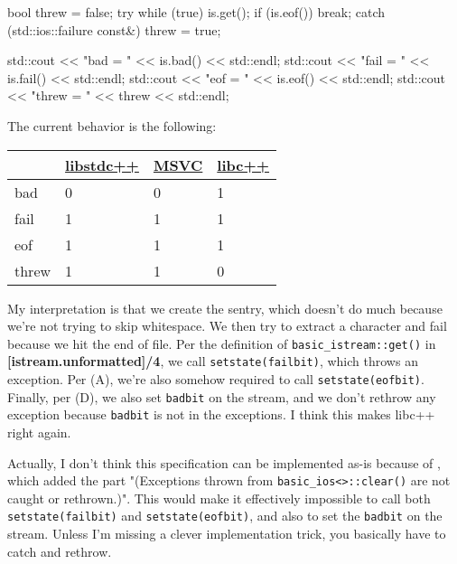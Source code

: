 \documentclass{wg21}
\newcommand{\cc}[1]{\texttt{#1}}
\begin{document}
\begin{enumerate}
\begin{cpp}
{      bool threw = false;
      try {
          while (true) {
              is.get();
              if (is.eof())
                  break;
          }
      } catch (std::ios::failure const&) {
          threw = true;
      }

      std::cout << "bad = " << is.bad() << std::endl;
      std::cout << "fail = " << is.fail() << std::endl;
      std::cout << "eof = " << is.eof() << std::endl;
      std::cout << "threw = " << threw << std::endl;
  }
  \end{cpp}

  The current behavior is the following:
  \begin{center}
  \begin{tabular}{| l | l | l | l |}
  \hline
         & \href{https://wandbox.org/permlink/jSSGM6TcqLzZSl6M}{libstdc++}
         & \href{http://rextester.com/OPIJW60076}{MSVC}
         & \href{https://wandbox.org/permlink/O302uzC1VW0nW1Pn}{libc++} \\ \hline
  bad    & 0         & 0    & 1      \\ \hline
  fail   & 1         & 1    & 1      \\ \hline
  eof    & 1         & 1    & 1      \\ \hline
  threw  & 1         & 1    & 0      \\ \hline
  \end{tabular}
  \end{center}

  My interpretation is that we create the sentry, which doesn't do much because we're not trying to skip whitespace. We then try to extract a character and fail because we hit the end of file. Per the definition of \cc{basic_istream::get()} in \textbf{[istream.unformatted]/4}, we call \cc{setstate(failbit)}, which throws an exception. Per (A), we're also somehow required to call \cc{setstate(eofbit)}. Finally, per (D), we also set \cc{badbit} on the stream, and we don't rethrow any exception because \cc{badbit} is not in the exceptions. I think this makes libc++ right again.

  Actually, I don't think this specification can be implemented as-is because of \cite{LWG61}, which added the part "(Exceptions thrown from \cc{basic_ios<>::clear()} are not caught or rethrown.)". This would make it effectively impossible to call both \cc{setstate(failbit)} and \cc{setstate(eofbit)}, and also to set the \cc{badbit} on the stream. Unless I'm missing a clever implementation trick, you basically have to catch and rethrow.
\end{enumerate}
\end{document}
